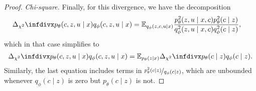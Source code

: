 \begin{proof}
\textit{Chi-square.} Finally, for this divergence, we have the decomposition
\begin{align}
    \chidiv{p_\theta(c, z, u \mid x)}{q_\phi(c, z, u \mid x)} &= \mathbb{E}_{q_\phi(z, c, u \mid x)} \frac{p^2_\theta(z, u\mid x, c)p^2_\theta(c \mid z)}{q^2_\phi(z, u \mid x, c)q^2_\phi(c \mid z)},
\end{align}
which in that case simplifies to
\begin{align}
    \chidiv{p_\theta(c, z, u \mid x)}{q_\phi(c, z, u \mid x)} = \mathbb{E}_{p_\theta(z \mid x)} \chidiv{p_\theta(c \mid z)}{q_\phi(c \mid z)}.
\end{align}
Similarly, the last equation includes terms in $\nicefrac{p^2_\theta(c \mid z)}{q_\phi(c \mid z)}$, which are unbounded whenever $q_\phi(c \mid z)$ is zero but $p_\theta(c \mid z)$ is not.
\end{proof}

\renewcommand{\thesection}{\thechapter.\arabic{section}}